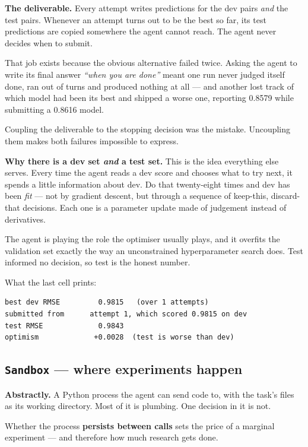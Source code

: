 \documentclass[11pt]{article}
\newcommand{\keyidea}[1]{\begin{idea}#1\end{idea}}
\newcommand{\runin}[1]{\smallskip\noindent\textbf{#1}\quad}
\begin{document}
\medskip\noindent\textbf{The deliverable.} Every attempt writes predictions for the dev pairs
\emph{and} the test pairs. Whenever an attempt turns out to be the best so far, its test
predictions are copied somewhere the agent cannot reach. The agent never decides when to submit.

That job exists because the obvious alternative failed twice. Asking the agent to write its final
answer \emph{``when you are done''} meant one run never judged itself done, ran out of turns and
produced nothing at all --- and another lost track of which model had been its best and shipped a
worse one, reporting 0.8579 while submitting a 0.8616 model.

\keyidea{Coupling the deliverable to the stopping decision was the mistake. Uncoupling them makes
both failures impossible to express.}

\runin{Why there is a dev set \emph{and} a test set.}
This is the idea everything else serves. Every time the agent reads a dev score and chooses what
to try next, it spends a little information about dev. Do that twenty-eight times and dev has
been \emph{fit} --- not by gradient descent, but through a sequence of keep-this, discard-that
decisions. Each one is a parameter update made of judgement instead of derivatives.

\keyidea{The agent is playing the role the optimiser usually plays, and it overfits the
validation set exactly the way an unconstrained hyperparameter search does. Test informed no
decision, so test is the honest number.}

\noindent What the last cell prints:

\begin{lstlisting}
best dev RMSE         0.9815   (over 1 attempts)
submitted from      attempt 1, which scored 0.9815 on dev
test RMSE             0.9843
optimism             +0.0028  (test is worse than dev)
\end{lstlisting}

\subsection{\texttt{Sandbox} --- where experiments happen}

\runin{Abstractly.}
A Python process the agent can send code to, with the task's files as its working directory. Most
of it is plumbing. One decision in it is not.

\keyidea{Whether the process \textbf{persists between calls} sets the price of a marginal
experiment --- and therefore how much research gets done.}
\end{document}
